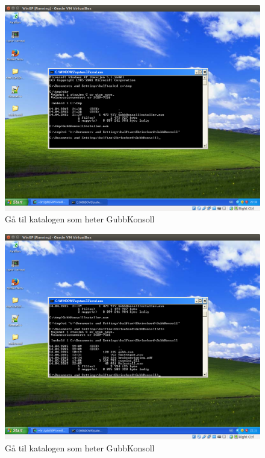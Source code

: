 \documentclass[12pt]{book}
\begin{document}
\begin{figure}[h]
\includegraphics[width=15cm]{007}
\caption{Gå til katalogen som heter GubbKonsoll}
\end{figure}

\begin{figure}[h]
\includegraphics[width=15cm]{008}
\caption{Gå til katalogen som heter GubbKonsoll}
\end{figure}
\end{document}
